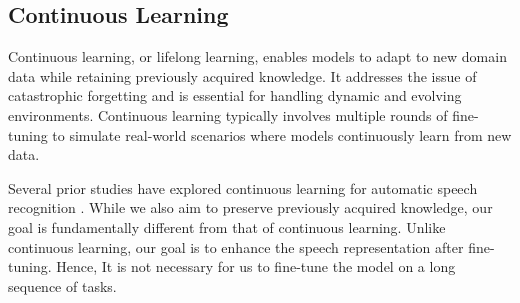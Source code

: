 \subsection{Continuous Learning}
Continuous learning, or lifelong learning, enables models to adapt to new domain data while retaining previously acquired knowledge. It addresses the issue of catastrophic forgetting \cite{kirkpatrick2017overcoming} and is essential for handling dynamic and evolving environments. Continuous learning typically involves multiple rounds of fine-tuning to simulate real-world scenarios where models continuously learn from new data.

Several prior studies have explored continuous learning for automatic speech recognition \cite{kulshreshtha2024sequential, houston2020continual, li2022massively}.
While we also aim to preserve previously acquired knowledge, 
our goal is fundamentally different from that of continuous learning. Unlike continuous learning, our goal is to enhance the speech representation after fine-tuning. Hence, It is not necessary for us to fine-tune the model on a long sequence of tasks.